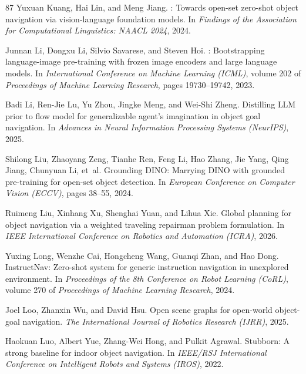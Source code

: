 \documentclass[10pt]{article}
\begin{document}
\begin{thebibliography}{87}
Yuxuan Kuang, Hai Lin, and Meng Jiang.
: Towards open-set zero-shot object navigation via vision-language foundation models.
\newblock In \emph{Findings of the Association for Computational Linguistics: NAACL 2024}, 2024.

Junnan Li, Dongxu Li, Silvio Savarese, and Steven Hoi.
: Bootstrapping language-image pre-training with frozen image encoders and large language models.
\newblock In \emph{International Conference on Machine Learning (ICML)}, volume 202 of \emph{Proceedings of Machine Learning Research}, pages 19730--19742, 2023.

Badi Li, Ren-Jie Lu, Yu Zhou, Jingke Meng, and Wei-Shi Zheng.
\newblock Distilling {LLM} prior to flow model for generalizable agent's imagination in object goal navigation.
\newblock In \emph{Advances in Neural Information Processing Systems (NeurIPS)}, 2025.

Shilong Liu, Zhaoyang Zeng, Tianhe Ren, Feng Li, Hao Zhang, Jie Yang, Qing Jiang, Chunyuan Li, et~al.
\newblock Grounding {DINO}: Marrying {DINO} with grounded pre-training for open-set object detection.
\newblock In \emph{European Conference on Computer Vision (ECCV)}, pages 38--55, 2024.

Ruimeng Liu, Xinhang Xu, Shenghai Yuan, and Lihua Xie.
\newblock Global planning for object navigation via a weighted traveling repairman problem formulation.
\newblock In \emph{IEEE International Conference on Robotics and Automation (ICRA)}, 2026.

Yuxing Long, Wenzhe Cai, Hongcheng Wang, Guanqi Zhan, and Hao Dong.
\newblock InstructNav: Zero-shot system for generic instruction navigation in unexplored environment.
\newblock In \emph{Proceedings of the 8th Conference on Robot Learning (CoRL)}, volume 270 of \emph{Proceedings of Machine Learning Research}, 2024.

Joel Loo, Zhanxin Wu, and David Hsu.
\newblock Open scene graphs for open-world object-goal navigation.
\newblock \emph{The International Journal of Robotics Research (IJRR)}, 2025.

Haokuan Luo, Albert Yue, Zhang-Wei Hong, and Pulkit Agrawal.
\newblock Stubborn: A strong baseline for indoor object navigation.
\newblock In \emph{IEEE/RSJ International Conference on Intelligent Robots and Systems (IROS)}, 2022.


\end{thebibliography}
\end{document}
